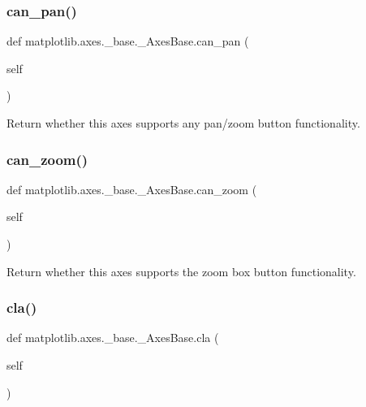 \subsubsection{\texorpdfstring{can\+\_\+pan()}{can\_pan()}}
{\footnotesize\ttfamily def matplotlib.\+axes.\+\_\+base.\+\_\+\+Axes\+Base.\+can\+\_\+pan (\begin{DoxyParamCaption}\item[{}]{self }\end{DoxyParamCaption})}

\begin{DoxyVerb}Return whether this axes supports any pan/zoom button functionality.
\end{DoxyVerb}
 \mbox{\label{classmatplotlib_1_1axes_1_1__base_1_1__AxesBase_a7eba2ce6e0cf7d55b9830c55321e7b7d}} 
\subsubsection{\texorpdfstring{can\+\_\+zoom()}{can\_zoom()}}
{\footnotesize\ttfamily def matplotlib.\+axes.\+\_\+base.\+\_\+\+Axes\+Base.\+can\+\_\+zoom (\begin{DoxyParamCaption}\item[{}]{self }\end{DoxyParamCaption})}

\begin{DoxyVerb}Return whether this axes supports the zoom box button functionality.
\end{DoxyVerb}
 \mbox{\label{classmatplotlib_1_1axes_1_1__base_1_1__AxesBase_a7e61a4465a925358894eb19d105f915d}} 
\subsubsection{\texorpdfstring{cla()}{cla()}}
{\footnotesize\ttfamily def matplotlib.\+axes.\+\_\+base.\+\_\+\+Axes\+Base.\+cla (\begin{DoxyParamCaption}\item[{}]{self }\end{DoxyParamCaption})}

